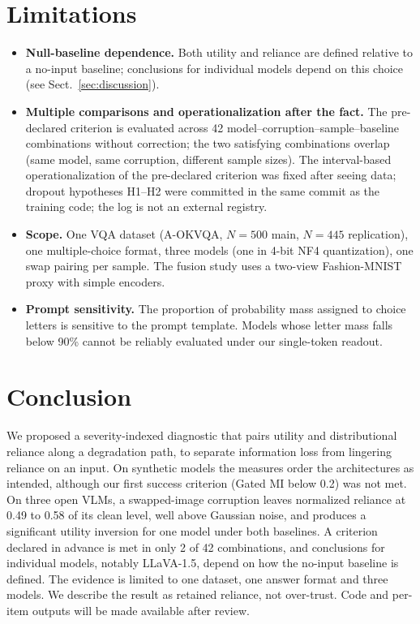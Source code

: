 \documentclass[graybox]{svmult}
\newcommand{\checknum}[2]{#1}
\begin{document}
\section{Limitations}
\label{sec:limitations}

\begin{itemize}
\item \textbf{Null-baseline dependence.} Both utility and reliance are
  defined relative to a no-input baseline; conclusions for individual
  models depend on this choice (see Sect.~\ref{sec:discussion}).

\item \textbf{Multiple comparisons and operationalization after the fact.} The
  pre-declared criterion is evaluated across 42
  model--corruption--sample--baseline combinations without correction; the
  two satisfying combinations overlap (same model, same corruption, different
  sample sizes). The interval-based operationalization of the pre-declared
  criterion was fixed after seeing data; dropout hypotheses H1--H2 were
  committed in the same commit as the training code; the log is not an external
  registry.

\item \textbf{Scope.} One VQA dataset (A-OKVQA, $N=500$ main,
  $N=445$ replication), one multiple-choice format, three models (one in
  4-bit NF4 quantization), one swap pairing per sample. The fusion study
  uses a two-view Fashion-MNIST proxy with simple encoders.

\item \textbf{Prompt sensitivity.} The proportion of probability mass
  assigned to choice letters is sensitive to the prompt template. Models
  whose letter mass falls below 90\% cannot be reliably evaluated under
  our single-token readout.
\end{itemize}

\section{Conclusion}
\label{sec:conclusion}

We proposed a severity-indexed diagnostic that pairs utility and
distributional reliance along a degradation path, to separate information
loss from lingering reliance on an input. On synthetic models the measures
order the architectures as intended, although our first success criterion
(Gated MI below 0.2) was not met. On three open VLMs, a swapped-image
corruption leaves normalized reliance at 0.49 to 0.58 of its clean level,
well above Gaussian noise, and produces a significant utility inversion for
one model under both baselines. A criterion declared in advance is met in
only \checknum{2}{criterion:status:count_met} of 42 combinations, and
conclusions for individual models, notably LLaVA-1.5, depend on how the
no-input baseline is defined. The evidence is limited to one dataset, one
answer format and three models. We describe the result as retained
reliance, not over-trust.
Code and per-item outputs will be made available after review.
\end{document}
